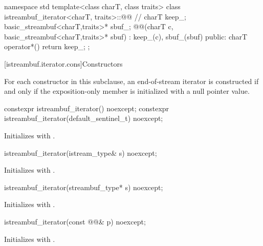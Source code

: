 %
\begin{codeblock}
namespace std {
  template<class charT, class traits>
  class istreambuf_iterator<charT, traits>::@@ { // \expos
    charT keep_;
    basic_streambuf<charT,traits>* sbuf_;
    @@(charT c, basic_streambuf<charT,traits>* sbuf)
      : keep_(c), sbuf_(sbuf) { }
  public:
    charT operator*() { return keep_; }
  };
}
\end{codeblock}

[istreambuf.iterator.cons]{Constructors}

\pnum
For each  constructor in this subclause,
an end-of-stream iterator is constructed if and only if
the exposition-only member  is initialized with a null pointer value.


%
\begin{itemdecl}
constexpr istreambuf_iterator() noexcept;
constexpr istreambuf_iterator(default_sentinel_t) noexcept;
\end{itemdecl}

\begin{itemdescr}
\pnum
\effects
Initializes  with .
\end{itemdescr}


%
\begin{itemdecl}
istreambuf_iterator(istream_type& s) noexcept;
\end{itemdecl}

\begin{itemdescr}
\pnum
\effects
Initializes  with .
\end{itemdescr}


%
\begin{itemdecl}
istreambuf_iterator(streambuf_type* s) noexcept;
\end{itemdecl}

\begin{itemdescr}
\pnum
\effects
Initializes  with .
\end{itemdescr}


%
\begin{itemdecl}
istreambuf_iterator(const @@& p) noexcept;
\end{itemdecl}

\begin{itemdescr}
\pnum
\effects
Initializes  with .
\end{itemdescr}

